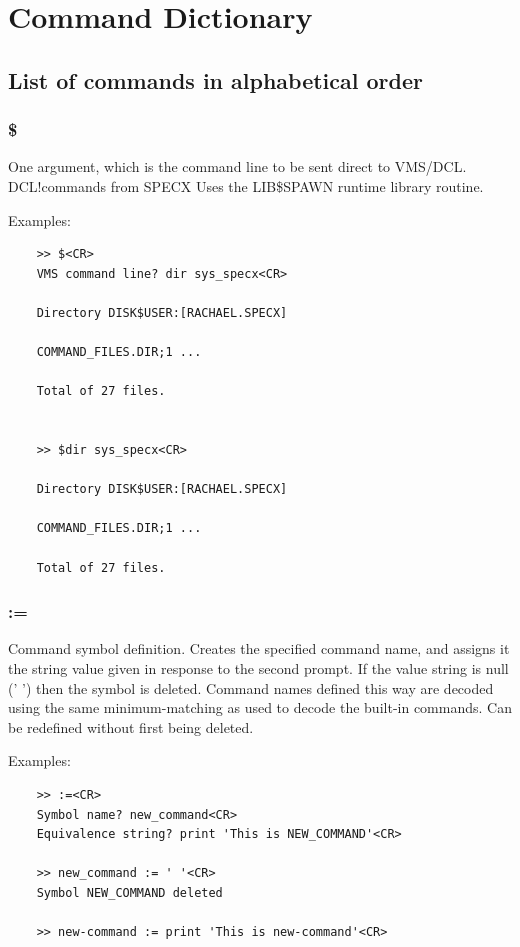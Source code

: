 \documentclass[11pt,twoside]{report}
\begin{document}
\chapter{Command Dictionary}
\section{List of commands in alphabetical order}
\subsection{\$} 

One argument, which is the command line to be sent direct to VMS/DCL. \index
{DCL!commands from SPECX} Uses the LIB\$SPAWN  runtime
library routine.

Examples:
\begin{verbatim}
    >> $<CR>
    VMS command line? dir sys_specx<CR>

    Directory DISK$USER:[RACHAEL.SPECX]

    COMMAND_FILES.DIR;1 ...

    Total of 27 files.


    >> $dir sys_specx<CR>

    Directory DISK$USER:[RACHAEL.SPECX]

    COMMAND_FILES.DIR;1 ...

    Total of 27 files.
\end{verbatim}

\subsection{:=} \index{:=} 

Command symbol definition. Creates the specified command name, and assigns
it the string value given in response to the second prompt. If the value
string is null (' ') then the symbol is deleted. Command names defined
this way are decoded using the same minimum-matching as used to decode the
built-in commands. Can be redefined without first being deleted.

Examples:
\begin{verbatim}
    >> :=<CR>
    Symbol name? new_command<CR>
    Equivalence string? print 'This is NEW_COMMAND'<CR>

    >> new_command := ' '<CR>
    Symbol NEW_COMMAND deleted

    >> new-command := print 'This is new-command'<CR>
\end{verbatim}
\end{document}
